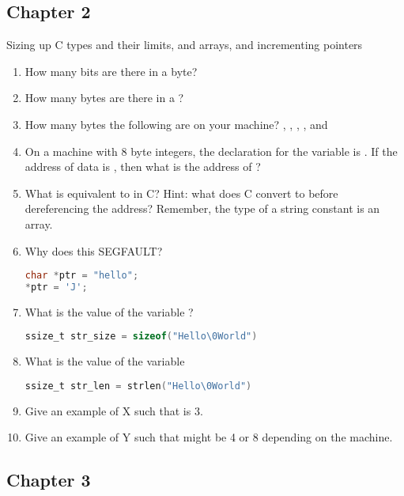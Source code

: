 \subsection{Chapter 2}

Sizing up C types and their limits,  and  arrays, and incrementing pointers

\begin{enumerate}
\item How many bits are there in a byte?
\item How many bytes are there in a ?
\item How many bytes the following are on your machine? , , , , and 
\item On a machine with 8 byte integers, the declaration for the variable  is .
If the address of data is , then what is the address of ?
\item What is  equivalent to in C? Hint: what does C convert  to before dereferencing the address?
Remember, the type of a string constant  is an array.
\item Why does this SEGFAULT?
\begin{lstlisting}[language=C]
char *ptr = "hello";
*ptr = 'J';
\end{lstlisting}

\item What is the value of the variable ?
\begin{lstlisting}[language=C]
ssize_t str_size = sizeof("Hello\0World")
\end{lstlisting}
\item What is the value of the variable 
\begin{lstlisting}[language=C]
ssize_t str_len = strlen("Hello\0World")
\end{lstlisting}
\item Give an example of X such that  is 3.
\item Give an example of Y such that  might be 4 or 8 depending on the machine.
\end{enumerate}

\subsection{Chapter 3}


